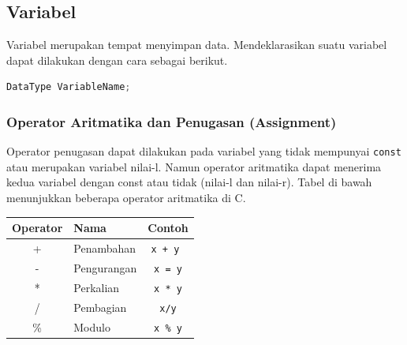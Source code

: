 \subsection{Variabel}
Variabel merupakan tempat menyimpan data. Mendeklarasikan suatu variabel dapat dilakukan dengan cara sebagai berikut.
\begin{lstlisting}[language=c,caption=Deklarasi Variabel C,label=lst:deklarasivariabel,captionpos=t]
DataType VariableName;
\end{lstlisting}
\subsubsection{Operator Aritmatika dan Penugasan (Assignment)}
Operator penugasan dapat dilakukan pada variabel yang tidak mempunyai \verb*|const| atau merupakan variabel nilai-l. Namun operator aritmatika dapat menerima kedua variabel dengan const atau tidak (nilai-l dan nilai-r).
Tabel di bawah menunjukkan beberapa operator aritmatika di C.
\begin{center}
	\begin{tabular}{|c|l|c|}
		\hline
		\multicolumn{1}{|l|}{Operator} & Nama & \multicolumn{1}{l|}{Contoh} \\ \hline
		+  & Penambahan &\verb|x + y |  \\ \hline
		-  & Pengurangan &\verb|x = y|   \\ \hline
		*  & Perkalian   & \verb|x * y|  \\ \hline
		/  & Pembagian   & \verb|x/y|  \\ \hline
		\% & Modulo     & \verb|x % y| \\ \hline
	\end{tabular}
\end{center}

